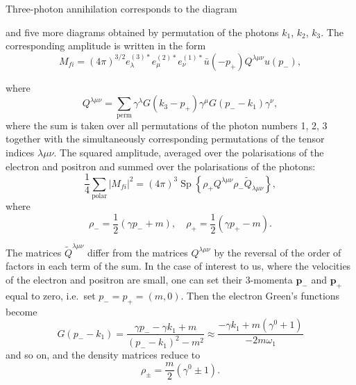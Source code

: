 Three-photon annihilation corresponds to the diagram

and five more diagrams obtained by permutation of the photons $k_1$, $k_2$, $k_3$. The corresponding amplitude is written in the form
\begin{equation}
M_{fi} = (4\pi)^{3/2} e_\lambda^{(3)*} e_\mu^{(2)*} e_\nu^{(1)*} \bar{u}(-p_+)Q^{\lambda\mu\nu}u(p_-),
\label{eq:89.9}
\end{equation}


where
\begin{equation}
Q^{\lambda\mu\nu} = \sum_\text{perm} \gamma^\lambda G(k_3 - p_+)\gamma^\mu G(p_- - k_1)\gamma^\nu,
\label{eq:89.10}
\end{equation}
where the sum is taken over all permutations of the photon numbers 1, 2, 3 together with the simultaneously corresponding permutations of the tensor indices $\lambda\mu\nu$. The squared amplitude, averaged over the polarisations of the electron and positron and summed over the polarisations of the photons:
\begin{equation}
\frac{1}{4}\sum_\text{polar} |M_{fi}|^2 = (4\pi)^3\operatorname{Sp}\!\left\{\rho_+Q^{\lambda\mu\nu}\rho_-\widetilde{Q}_{\lambda\mu\nu}\right\},
\label{eq:89.11}
\end{equation}
where
\[
\rho_- = \frac{1}{2}(\gamma p_- + m), \quad \rho_+ = \frac{1}{2}(\gamma p_+ - m).
\]

The matrices $\widetilde{Q}^{\lambda\mu\nu}$ differ from the matrices $Q^{\lambda\mu\nu}$ by the reversal of the order of factors in each term of the sum. In the case of interest to us, where the velocities of the electron and positron are small, one can set their 3-momenta $\mathbf{p}_-$ and $\mathbf{p}_+$ equal to zero, i.e.\ set $p_- = p_+ = (m, 0)$. Then the electron Green's functions become
\[
G(p_- - k_1) = \frac{\gamma p_- - \gamma k_1 + m}{(p_- - k_1)^2 - m^2} \approx \frac{-\gamma k_1 + m(\gamma^0 + 1)}{-2m\omega_1}
\]
and so on, and the density matrices reduce to
\[
\rho_\pm = \frac{m}{2}(\gamma^0 \pm 1).
\]

